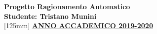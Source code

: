 \documentclass{article}
\begin{document}

\begin{titlepage}
 	\centering
  \Huge{\textbf{Progetto Ragionamento Automatico}}\\
 	[30mm]
 	\centering
  \Huge{\textbf{Studente: Tristano Munini}}\\
 	[125mm]
 	\centering
  \LARGE{\underline{\textbf{ANNO ACCADEMICO 2019-2020}}}\\
\end{titlepage}












\end{document}
